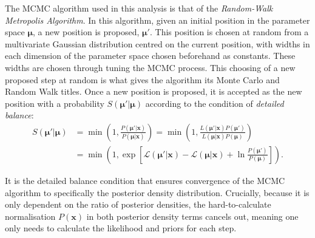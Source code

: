 The MCMC algorithm used in this analysis is that of the \textit{Random-Walk Metropolis Algorithm}. In this algorithm, given an initial position in the parameter space $\bm{\mu}$, a new position is proposed, $\bm{\mu}'$. This position is chosen at random from a multivariate Gaussian distribution centred on the current position, with widths in each dimension of the parameter space chosen beforehand as constants. These widths are chosen through tuning the MCMC process. This choosing of a new proposed step at random is what gives the algorithm its Monte Carlo and Random Walk titles. Once a new position is proposed, it is accepted as the new position with a probability $S\left(\bm{\mu}'|\bm{\mu}\right)$ according to the condition of \textit{detailed balance}:
\begin{align}
    S\left(\bm{\mu}'|\bm{\mu}\right) &= 
    \min{\left(
        1,
        \frac{P\left(\bm{\mu}'|\bm{x}\right)}{P\left(\bm{\mu}|\bm{x}\right)}
        \right)
        } = 
    \min{\left(
        1,
        \frac{L\left(\bm{\mu}'|\bm{x}\right)P\left(\bm{\mu}'\right)}{L\left(\bm{\mu}|\bm{x}\right)P\left(\bm{\mu}\right)}
        \right)
    }\nonumber\\
    &= \min{\left(
        1,
        \exp{\left[\mathcal{L}\left(\bm{\mu}'|\bm{x}\right)-\mathcal{L}\left(\bm{\mu}|\bm{x}\right)+\ln{\frac{P\left(\bm{\mu}'\right)}{P\left(\bm{\mu}\right)}}\right]}
        \right)
    }.
\end{align}

It is the detailed balance condition that ensures convergence of the MCMC algorithm to specifically the posterior density distribution. Crucially, because it is only dependent on the ratio of posterior densities, the hard-to-calculate normalisation $P\left(\bm{x}\right)$ in both posterior density terms cancels out, meaning one only needs to calculate the likelihood and priors for each step.

